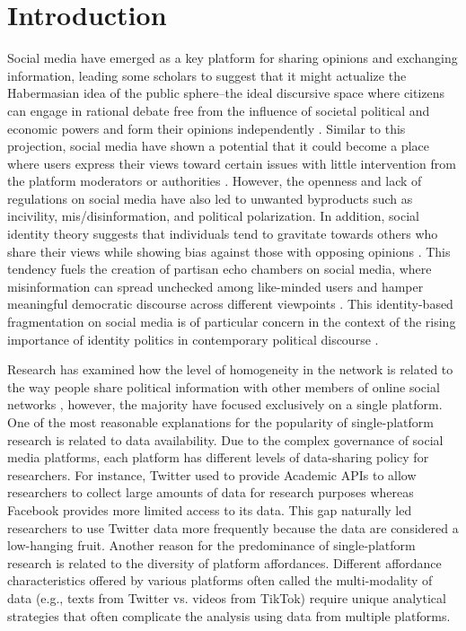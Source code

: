 \documentclass[Crown,sagev,times]{sagej}
\begin{document}
\section{Introduction} \label{sec:intro}

Social media have emerged as a key platform for sharing opinions and exchanging information, leading some scholars to suggest that 
it might actualize the Habermasian idea of the public sphere--the ideal discursive space where citizens can engage in rational debate 
free from the influence of societal political and economic powers and form their opinions independently \cite{Bruns2015,Benkler2006, habermas1991structural}.
Similar to this projection, social media have shown a potential that it could become a place where users express their views toward certain issues 
\cite{ocal2021reasoning} with little intervention from the platform moderators or authorities \cite{gibbs2013overcoming}. 
However, the openness and lack of regulations on social media have also led to unwanted byproducts such as incivility, mis/disinformation, 
and political polarization. In addition, social identity theory suggests that individuals tend to gravitate towards others who share their views 
while showing bias against those with opposing opinions \cite{tajfel1979integrative}. This tendency fuels the creation of partisan echo chambers 
on social media, where misinformation can spread unchecked among like-minded users and hamper meaningful democratic discourse 
across different viewpoints \cite{sunstein2018republic, grevet2014managing}. 
This identity-based fragmentation on social media is of particular concern in the context of the rising importance of identity politics 
in contemporary political discourse \cite{Cramer2016}.

Research has examined how the level of homogeneity in the network is related to the way people share 
political information with other members of online social networks \cite{gibbs2013overcoming, Conover2011}, 
however, the majority have focused exclusively on a single platform. One of the most reasonable explanations 
for the popularity of single-platform research is related to data availability. Due to the complex governance of social media platforms, 
each platform has different levels of data-sharing policy for researchers. For instance, Twitter used to provide Academic APIs 
to allow researchers to collect large amounts of data for research purposes whereas Facebook provides more limited access to its data. 
This gap naturally led researchers to use Twitter data more frequently because the data are considered a low-hanging fruit. 
Another reason for the predominance of single-platform research is related to the diversity of platform affordances. 
Different affordance characteristics offered by various platforms often called the multi-modality of data 
(e.g., texts from Twitter vs. videos from TikTok) require unique analytical strategies that often complicate the analysis using data from multiple platforms.
\end{document}

